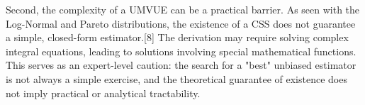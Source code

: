 \documentclass[11pt, letterpaper]{article}
\begin{document}
Second, the complexity of a UMVUE can be a practical barrier. As seen with the Log-Normal and Pareto distributions, the existence of a CSS does not guarantee a simple, closed-form estimator.[8] The derivation may require solving complex integral equations, leading to solutions involving special mathematical functions. This serves as an expert-level caution: the search for a "best" unbiased estimator is not always a simple exercise, and the theoretical guarantee of existence does not imply practical or analytical tractability.
\end{document}
